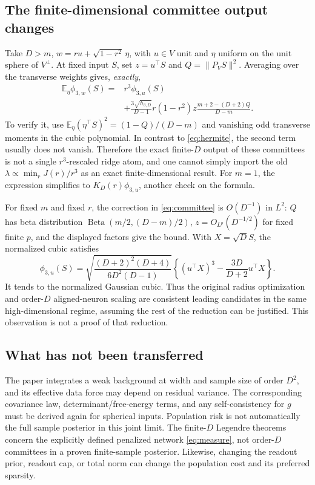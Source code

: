 \documentclass[11pt]{article}
\newcommand{\E}{\mathbb E}
\newcommand{\norm}[1]{\lVert #1\rVert}
\theoremstyle{remark}
\begin{document}
\subsection{The finite-dimensional committee output changes}
Take $D>m$, $w=ru+\sqrt{1-r^2}\,\eta$, with $u\in V$ unit and
$\eta$ uniform on the unit sphere of $V^\perp$. At fixed input $S$, set
$z=u^\top S$ and $Q=\norm{P_VS}^2$. Averaging over the transverse weights
gives, \emph{exactly},
\begin{align}\label{eq:committee}
 \E_\eta\phi_{3,w}(S)
 ={}&r^3\phi_{3,u}(S)\\
 &+\frac{3\sqrt{h_{3,D}}}{D-1}r(1-r^2)z
     \frac{m+2-(D+2)Q}{D-m}.\nonumber
\end{align}
To verify it, use $\E_\eta(\eta^\top S)^2=(1-Q)/(D-m)$ and vanishing
odd transverse moments in the cubic polynomial. In contrast to
\eqref{eq:hermite}, the second term usually does not vanish. Therefore
the exact finite-$D$ output of these committees is not a single
$r^3$-rescaled ridge atom, and one cannot simply import the old
$\lambda\propto\min_rJ(r)/r^3$ as an exact finite-dimensional result.
For $m=1$, the expression simplifies to
$K_D(r)\phi_{3,u}$, another check on the formula.

For fixed $m$ and fixed $r$, the correction in \eqref{eq:committee}
is $O(D^{-1})$ in $L^2$: $Q$ has beta distribution
$\operatorname{Beta}(m/2,(D-m)/2)$, $z=O_{L^p}(D^{-1/2})$
for fixed finite $p$, and the displayed factors give the bound.
With $X=\sqrt D S$, the normalized cubic satisfies
\begin{equation}
 \phi_{3,u}(S)=
 \sqrt{\frac{(D+2)^2(D+4)}{6D^2(D-1)}}
 \left\{(u^\top X)^3-\frac{3D}{D+2}u^\top X\right\}.
\end{equation}
It tends to the normalized Gaussian cubic. Thus the original radius
optimization and order-$D$ aligned-neuron scaling are consistent leading
candidates in the same high-dimensional regime, assuming the rest of the
reduction can be justified. This observation is not a proof of that reduction.

\subsection{What has not been transferred}
The paper integrates a weak background at width and sample size of order
$D^2$, and its effective data force may depend on residual variance.
The corresponding covariance law, determinant/free-energy terms, and any
self-consistency for $g$ must be derived again for spherical inputs.
Population risk is not automatically the full sample posterior in this
joint limit. The finite-$D$ Legendre theorems concern the explicitly defined
penalized network \eqref{eq:measure}, not order-$D$ committees in a proven
finite-sample posterior. Likewise, changing the readout prior, readout cap,
or total norm can change the population cost and its preferred sparsity.
\end{document}
